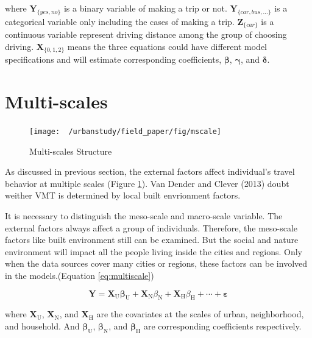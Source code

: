 \documentclass[
  11pt,
  openany]{memoir}
\begin{document}
where \(\mathbf{Y}_{\{yes,no\}}\) is a binary variable of making a trip or not. \(\mathbf{Y}_{\{car,bus,...\}}\) is a categorical variable only including the cases of making a trip. \(\mathbf{Z}_{\{car\}}\) is a continuous variable represent driving distance among the group of choosing driving. \(\mathbf{X}_{\{0,1,2\}}\) means the three equations could have different model specifications and will estimate corresponding coefficients, \(\boldsymbol{\beta}\), \(\boldsymbol{\gamma}\), and \(\boldsymbol{\delta}\).

\hypertarget{multi-scales}{%
\section{Multi-scales}\label{multi-scales}}

\begin{figure}

{\centering \texttt{[image: ~/urbanstudy/field\_paper/fig/mscale]} 

}

\caption{Multi-scales Structure}\label{fig:Mscale}
\end{figure}

As discussed in previous section, the external factors affect individual's travel behavior at multiple scales (Figure \ref{fig:Mscale}).
Van Dender and Clever (2013) doubt weither VMT is determined by local built envrionment factors.

It is necessary to distinguish the meso-scale and macro-scale variable.
The external factors always affect a group of individuals. Therefore, the meso-scale factors like built environment still can be examined. But the social and nature environment will impact all the people living inside the cities and regions.
Only when the data sources cover many cities or regions, these factors can be involved in the models.(Equation \eqref{eq:multiscale})

\begin{equation}
\label{eq:multiscale}
\mathbf{Y}=\mathbf{X}_\mathrm{U}\boldsymbol{\beta}_\mathrm{U}+\mathbf{X}_\mathrm{N}{\beta}_\mathrm{N}+\mathbf{X}_\mathrm{H}{\beta}_\mathrm{H}+\cdots+\boldsymbol{\varepsilon}
\end{equation}

where \(\mathbf{X}_\mathrm{U}\), \(\mathbf{X}_\mathrm{N}\), and \(\mathbf{X}_\mathrm{H}\) are the covariates at the scales of urban, neighborhood, and household. And \(\boldsymbol{\beta}_\mathrm{U}\), \(\boldsymbol{\beta}_\mathrm{N}\), and \(\boldsymbol{\beta}_\mathrm{H}\) are corresponding coefficients respectively.
\end{document}
